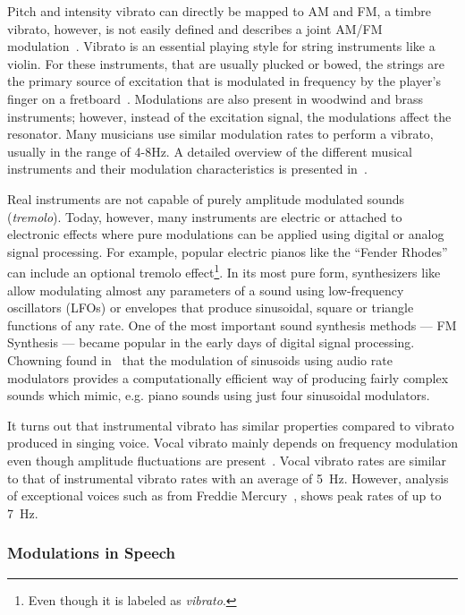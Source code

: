 Pitch and intensity vibrato can directly be mapped to AM and FM, a timbre vibrato, however, is not easily defined and describes a joint AM/FM modulation~\cite{desain99}.
Vibrato is an essential playing style for string instruments like a violin. 
For these instruments, that are usually plucked or bowed, the strings are the primary source of excitation that is modulated in frequency by the player's finger on a fretboard~\cite{macleod06}.
Modulations are also present in woodwind and brass instruments; however, instead of the excitation signal, the modulations affect the resonator.
Many musicians use similar modulation rates to perform a vibrato, usually in the range of 4-8\si{\hertz}.
A detailed overview of the different musical instruments and their modulation characteristics is presented in~\cite{fletcher01}.
\par
Real instruments are not capable of purely amplitude modulated sounds (\emph{tremolo}). 
Today, however, many instruments are electric or attached to electronic effects where pure modulations can be applied using digital or analog signal processing.
For example, popular electric pianos like the ``Fender Rhodes'' can include an optional tremolo effect\footnote{Even though it is labeled as \emph{vibrato}.}.
In its most pure form, synthesizers like~\cite{pinch09, buchla05} allow modulating almost any parameters of a sound using low-frequency oscillators (LFOs) or envelopes that produce sinusoidal, square or triangle functions of any rate.
One of the most important sound synthesis methods --- FM Synthesis --- became popular in the early days of digital signal processing. 
Chowning found in~\cite{chowning73} that the modulation of sinusoids using audio rate modulators provides a computationally efficient way of producing fairly complex sounds which mimic, e.g. piano sounds using just four sinusoidal modulators.
\par
It turns out that instrumental vibrato has similar properties compared to vibrato produced in singing voice.
Vocal vibrato mainly depends on frequency modulation even though amplitude fluctuations are present~\cite{sundberg94}. 
Vocal vibrato rates are similar to that of instrumental vibrato rates with an average of 5~\si{\hertz}.
However, analysis of exceptional voices such as from Freddie Mercury~\cite{herbst17}, shows peak rates of up to 7~\si{\hertz}.

\subsubsection*{Modulations in Speech}

